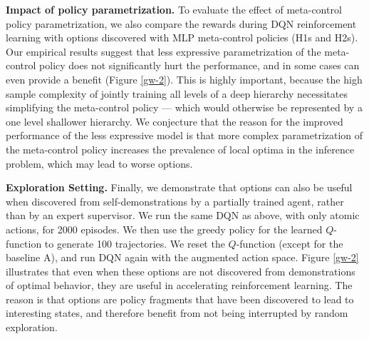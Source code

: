 {\bf Impact of policy parametrization.} To evaluate the effect of meta-control policy parametrization, we also compare the rewards during DQN reinforcement learning with options discovered with MLP meta-control policies (\textsf{H1s} and \textsf{H2s}). Our empirical results suggest that less expressive parametrization of the meta-control policy does not significantly hurt the performance, and in some cases can even provide a benefit (Figure \ref{gw-2}). This is highly important, because the high sample complexity of jointly training all levels of a deep hierarchy necessitates simplifying the meta-control policy --- which would otherwise be represented by a one level shallower hierarchy. We conjecture that the reason for the improved performance of the less expressive model is that more complex parametrization of the meta-control policy increases the prevalence of local optima in the inference problem, which may lead to worse options.

{\bf Exploration Setting.} Finally, we demonstrate that options can also be useful when discovered from self-demonstrations by a partially trained agent, rather than by an expert supervisor. We run the same DQN as above, with only atomic actions, for 2000 episodes. We then use the greedy policy for the learned $Q$-function to generate 100 trajectories.  We reset the $Q$-function (except for the baseline \textsf{A}), and run DQN again with the augmented action space. Figure \ref{gw-2} illustrates that even when these options are not discovered from demonstrations of optimal behavior, they are useful in accelerating reinforcement learning.
The reason is that options are policy fragments that have been discovered to lead to interesting states, and therefore benefit from not being interrupted by random exploration. 



